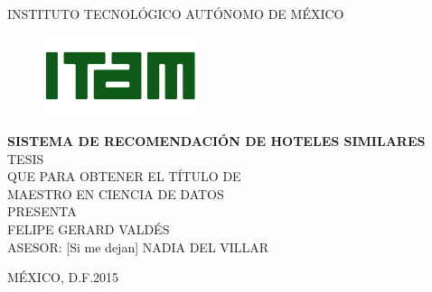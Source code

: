 \documentclass[12pt]{report}
\begin{document}
%
{\large
\begin{center}
INSTITUTO TECNOL\'OGICO AUT\'ONOMO DE M\'EXICO
\end{center}
\begin{figure}[h]
 	\centering
	\includegraphics[width=0.4\textwidth]{imagenes/logo_ITAM.jpg}
	\end{figure}
\begin{center}
\vspace{0cm}
\textbf{SISTEMA DE RECOMENDACIÓN DE HOTELES SIMILARES}\\
\vspace{1cm}
TESIS\\
\vspace{1cm}
{\normalsize QUE PARA OBTENER EL T\'ITULO DE}\\
\vspace{0.5cm}
MAESTRO EN CIENCIA DE DATOS\\
\vspace{0.5cm}
{\normalsize PRESENTA}\\
\vspace{1cm}
FELIPE GERARD VALD\'ES\\
\vspace{2cm}
{\normalsize ASESOR: [Si me dejan] NADIA DEL VILLAR}\\
\vspace{2cm}
\end{center}
\begin{flushleft}
M\'EXICO, D.F.\hfill 2015%
\end{flushleft}
}
 
\end{document}
